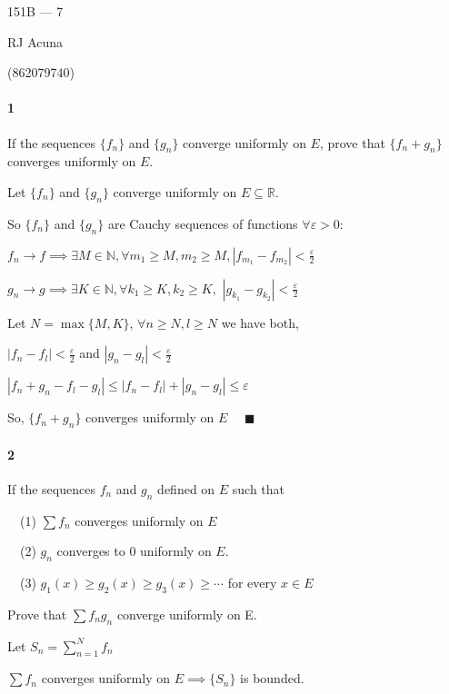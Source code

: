 \documentclass{article}
\newcommand\N{\mathbb{N}}
\newcommand\R{\mathbb{R}}
\begin{document}
\begin{center}
  151B --- 7

  RJ Acuna

  (862079740)
\end{center}\vspace{1.618em}

\paragraph{1} If the sequences $\{f_n\}$ and $\{g_n\}$ converge
uniformly on $E$, prove that $\{f_n+g_n\}$ converges uniformly on $E$.


Let $\{f_n\}$ and $\{g_n\}$ converge uniformly on $E\subseteq \R$.

So $\{f_n\}$ and $\{g_n\}$ are Cauchy sequences of functions
$\forall \varepsilon > 0:$

$f_n \rightarrow f \implies \exists M \in \N, \forall m_1 \geq M,
m_2\geq M, |f_{m_1} - f_{m_2}|<\frac{\varepsilon}{2}$

$g_n \rightarrow g \implies \exists K \in \N, \forall k_{1} \geq K,k_2
\geq K,$ $|g_{k_1}-g_{k_2}|<\frac{\varepsilon}{2}$

Let $N = \max \{M,K\}$, $\forall n\geq N,l\geq N$ we have both,

$|f_n - f_l|< \frac{\varepsilon}{2}$ and $|g_n - g_l|<\frac{\varepsilon}{2}$

$|f_n + g_n - f_l - g_l|\leq |f_n - f_l| + |g_n - g_l| \leq \varepsilon$

So, $\{f_n + g_n\}$ converges uniformly on $E$ $\quad \blacksquare$

\paragraph{2} If the sequences ${f_n}$ and ${g_n}$ defined on $E$ such that

$\quad$(1) $\sum f_n$ converges uniformly on $E$

$\quad$(2) $g_n$ converges to $0$ uniformly on $E$.

$\quad$(3) $g_1(x) ≥ g_2(x) ≥ g_3(x) ≥ \cdots$ for every $x ∈  E$

Prove that $\sum f_ng_n$ converge uniformly on E.


Let $S_n = \sum_{n=1}^{N} f_n$

$\sum f_n$ converges uniformly on $E\implies \{S_n\}$ is bounded.
\end{document}
